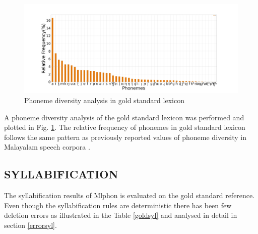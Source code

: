 \documentclass{ieeeaccess}
\begin{document}
\begin{figure}[h]
    \centering
    \includegraphics[width=\linewidth]{goldrichness.jpg}
    \caption{Phoneme diversity  analysis in gold standard lexicon}
    \label{goldrichness}
\end{figure}

A phoneme diversity analysis of the gold standard lexicon was performed and plotted in Fig. \ref{goldrichness}. The relative frequency of phonemes in gold standard lexicon follows the same pattern as previously reported values of phoneme diversity in Malayalam speech corpora \cite{smcspeech}.


\subsection{SYLLABIFICATION}

The syllabification results of Mlphon is evaluated on the gold standard reference. Even though the syllabification rules are deterministic there has been few deletion errors as illustrated in the Table \ref{goldsyl} and analysed in detail in section \ref{errorsyl}.
\end{document}
